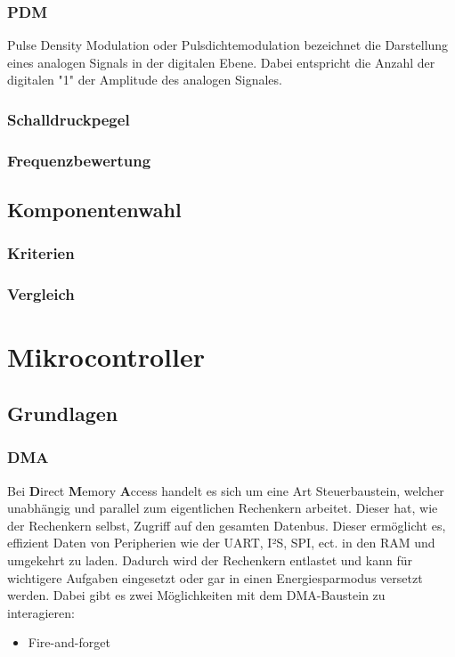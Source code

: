 \documentclass[12pt]{article}
\begin{document}
	\subsubsection{PDM}
	Pulse Density Modulation oder Pulsdichtemodulation bezeichnet die Darstellung eines analogen Signals in der digitalen Ebene. Dabei entspricht die Anzahl der digitalen "1" der Amplitude des analogen Signales.
	\subsubsection{Schalldruckpegel}
	\subsubsection{Frequenzbewertung}
	\subsection{Komponentenwahl}
	\subsubsection{Kriterien}
	\subsubsection{Vergleich}
	
	\newpage
	\section{Mikrocontroller}
	\subsection{Grundlagen}
	\subsubsection{DMA}
	Bei \textbf{D}irect \textbf{M}emory \textbf{A}ccess handelt es sich um eine Art Steuerbaustein, welcher unabhängig und parallel zum eigentlichen Rechenkern arbeitet. Dieser hat, wie der Rechenkern selbst, Zugriff auf den gesamten Datenbus. Dieser ermöglicht es, effizient Daten von Peripherien wie der UART, I²S, SPI, ect. in den RAM und umgekehrt zu laden. Dadurch wird der Rechenkern entlastet und kann für wichtigere Aufgaben eingesetzt oder gar in einen Energiesparmodus versetzt werden. Dabei gibt es zwei Möglichkeiten mit dem DMA-Baustein zu interagieren:
	\begin{itemize}
		\item Fire-and-forget
	\end{itemize}
\end{document}
